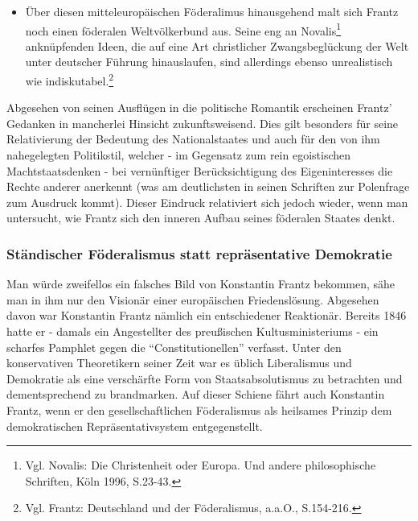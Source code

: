 \documentclass[a4paper,12pt]{article}
\begin{document}
\begin{itemize}
\item Über diesen mitteleuropäischen Föderalimus hinausgehend malt
sich Frantz noch einen föderalen Weltvölkerbund aus. Seine eng an
Novalis\footnote{Vgl. Novalis\cite{novalis}: Die Christenheit oder
Europa. Und andere philosophische Schriften, Köln 1996, S.23-43.}
anknüpfenden Ideen, die auf eine Art christlicher Zwangsbeglückung der
Welt unter deutscher Führung hinauslaufen, sind allerdings ebenso
unrealistisch wie
indiskutabel.\footnote{Vgl. Frantz\cite{frantz-deutschland}:
Deutschland und der Föderalismus, a.a.O., S.154-216.}

\end{itemize}

Abgesehen von seinen Ausflügen in die politische Romantik
erscheinen Frantz' Gedanken in mancherlei Hinsicht
zukunftsweisend. Dies gilt besonders für seine Relativierung der
Bedeutung des Nationalstaates und auch für den von ihm
nahegelegten Politikstil, welcher - im Gegensatz zum rein
egoistischen Machtstaatsdenken - bei vernünftiger Berücksichtigung
des Eigeninteresses die Rechte anderer anerkennt (was am
deutlichsten in seinen Schriften zur Polenfrage zum Ausdruck
kommt). Dieser Eindruck relativiert sich jedoch wieder, wenn man
untersucht, wie Frantz sich den inneren Aufbau seines föderalen
Staates denkt.

\subsubsection{Ständischer Föderalismus statt repräsentative Demokratie} 

Man würde zweifellos ein falsches Bild von Konstantin Frantz
bekommen, sähe man in ihm nur den Visionär einer europäischen
Friedenslösung. Abgesehen davon war Konstantin Frantz nämlich ein
entschiedener Reaktionär. Bereits 1846 hatte er - damals ein
Angestellter des preußischen Kultusministeriums - ein scharfes
Pamphlet gegen die ``Constitutionellen'' verfasst. Unter den
konservativen Theoretikern seiner Zeit war es üblich Liberalismus
und Demokratie als eine verschärfte Form von Staatsabsolutismus zu
betrachten und dementsprechend zu brandmarken. Auf dieser Schiene
fährt auch Konstantin Frantz, wenn er den gesellschaftlichen
Föderalismus als heilsames Prinzip dem demokratischen
Repräsentativsystem entgegenstellt.
\end{document}
